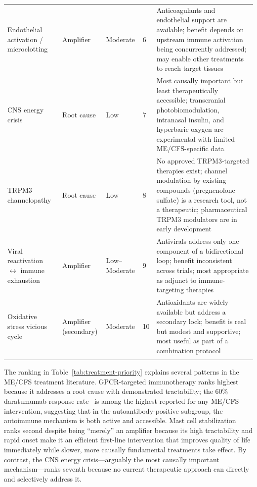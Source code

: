 \begin{landscape}
\begin{longtable}{p{3.5cm}p{2.5cm}p{2.5cm}p{2.5cm}p{5.5cm}}
Endothelial activation / microclotting & Amplifier & Moderate & 6 & Anticoagulants and endothelial support are available; benefit depends on upstream immune activation being concurrently addressed; may enable other treatments to reach target tissues \\
\addlinespace

CNS energy crisis & Root cause & Low & 7 & Most causally important but least therapeutically accessible; transcranial photobiomodulation, intranasal insulin, and hyperbaric oxygen are experimental with limited ME/CFS-specific data \\
\addlinespace

TRPM3 channelopathy & Root cause & Low & 8 & No approved TRPM3-targeted therapies exist; channel modulation by existing compounds (pregnenolone sulfate) is a research tool, not a therapeutic; pharmaceutical TRPM3 modulators are in early development \\
\addlinespace

Viral reactivation $\leftrightarrow$ immune exhaustion & Amplifier & Low--Moderate & 9 & Antivirals address only one component of a bidirectional loop; benefit inconsistent across trials; most appropriate as adjunct to immune-targeting therapies \\
\addlinespace

Oxidative stress vicious cycle & Amplifier (secondary) & Moderate & 10 & Antioxidants are widely available but address a secondary lock; benefit is real but modest and supportive; most useful as part of a combination protocol \\
\addlinespace

\end{longtable}
\end{landscape}

The ranking in Table~\ref{tab:treatment-priority} explains several patterns in the ME/CFS treatment literature. GPCR-targeted immunotherapy ranks highest because it addresses a root cause with demonstrated tractability; the 60\% daratumumab response rate~\cite{Fluge2025daratumumab} is among the highest reported for any ME/CFS intervention, suggesting that in the autoantibody-positive subgroup, the autoimmune mechanism is both active and accessible. Mast cell stabilization ranks second despite being ``merely'' an amplifier because its high tractability and rapid onset make it an efficient first-line intervention that improves quality of life immediately while slower, more causally fundamental treatments take effect. By contrast, the CNS energy crisis---arguably the most causally important mechanism---ranks seventh because no current therapeutic approach can directly and selectively address it.

